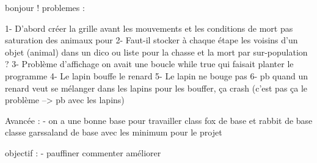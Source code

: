 

bonjour !
problemes :

1- D'abord créer la grille avant les mouvements et les conditions de mort pas saturation des animaux pour 
2- Faut-il stocker à chaque étape les voisins d'un objet (animal) dans un dico ou liste pour la chasse et la mort par sur-population ?
3- Problème d'affichage on avait une boucle while true qui faisait planter le programme
4- Le lapin bouffe le renard
5- Le lapin ne bouge pas
6- pb quand un renard veut se mélanger dans les lapins pour les bouffer, ça crash (c'est pas ça le problème --> pb avec les lapins)


Avancée :
- on a une bonne base pour travailler 
class fox de base et rabbit de base 
classe garssaland de base avec les minimum pour le projet 


objectif :
- pauffiner commenter améliorer 


 


